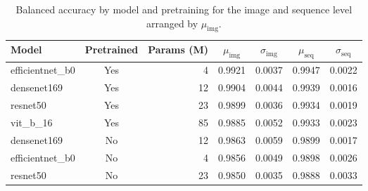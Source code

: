 \begin{table}[H]
\caption{Balanced accuracy by model and pretraining for the image and sequence level arranged by $\mu_{\mathrm{img}}$.}
\label{tab:bal_acc_by_model}
\begin{tabular}{l c r c c c c}
\toprule
Model & Pretrained & Params (M) & $\mu_{\mathrm{img}}$ & $\sigma_{\mathrm{img}}$ & $\mu_{\mathrm{seq}}$ & $\sigma_{\mathrm{seq}}$ \\
\midrule
efficientnet\_b0 & Yes & 4 & 0.9921 & 0.0037 & 0.9947 & 0.0022 \\
densenet169 & Yes & 12 & 0.9904 & 0.0044 & 0.9939 & 0.0016 \\
resnet50 & Yes & 23 & 0.9899 & 0.0036 & 0.9934 & 0.0019 \\
vit\_b\_16 & Yes & 85 & 0.9885 & 0.0052 & 0.9933 & 0.0023 \\
densenet169 & No & 12 & 0.9863 & 0.0059 & 0.9899 & 0.0017 \\
efficientnet\_b0 & No & 4 & 0.9856 & 0.0049 & 0.9898 & 0.0026 \\
resnet50 & No & 23 & 0.9850 & 0.0035 & 0.9888 & 0.0033 \\
\bottomrule
\end{tabular}
\end{table}
